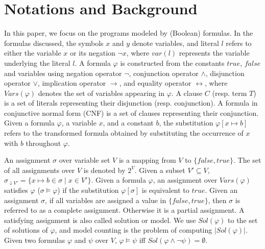 \section{Notations and Background}
\label{sec:Notation}

In this paper, we focus on the programs modeled by (Boolean) formulas.
In the formulas discussed, the symbols $x$ and $y$ denote variables, and literal $l$ refers to either the variable $x$ or its negation $\neg x$, where $var(l)$ represents the variable underlying the literal $l$.
A formula $\varphi$ is constructed from the constants $\mathit{true}$, $\mathit{false}$ and variables using negation operator $\neg$, conjunction operator $\wedge$, disjunction operator $\vee$, implication operator $\rightarrow$, and equality operator $\leftrightarrow$, where $\mathit{Vars}(\varphi)$ denotes the set of variables appearing in $\varphi$.
A clause $C$ (resp. term $T$) is a set of literals representing their disjunction (resp. conjunction).
A formula in conjunctive normal form (CNF) is a set of clauses representing their conjunction.
Given a formula $\varphi$, a variable $x$, and a constant $b$, the substitution $\varphi[x \mapsto b]$ refers to the transformed formula obtained by substituting the occurrence of $x$ with $b$ throughout $\varphi$.

An assignment $\sigma$ over variable set $V$ is a mapping from $V$ to $\{ \mathit{false}, \mathit{true} \}$.%
The set of all assignments over $V$ is denoted by $2^V$.
Given a subset $V' \subseteq V$, $\sigma_{\downarrow V'} = \{x \mapsto b \in \sigma \mid x \in V'\}$.
Given a formula $\varphi$, an assignment over $\mathit{Vars}(\varphi)$ satisfies $\varphi$ ($\sigma \models \varphi$) if the substitution $\varphi[\sigma]$ is equivalent to $\mathit{true}$.
Given an assignment $\sigma$, if all variables are assigned a value in $\{\mathit{false}, \mathit{true}\}$, then $\sigma$ is referred to as a complete assignment. Otherwise it is a partial assignment.
A satisfying assignment is also called solution or model.
We use $\mathit{Sol}(\varphi)$ to the set of solutions of $\varphi$, and model counting is the problem of computing $|\mathit{Sol}(\varphi)|$.   
Given two formulas $\varphi$ and $\psi$ over $V$, $\varphi \models \psi$ iff $\mathit{Sol}( \varphi \land \lnot\psi) = \emptyset$.

